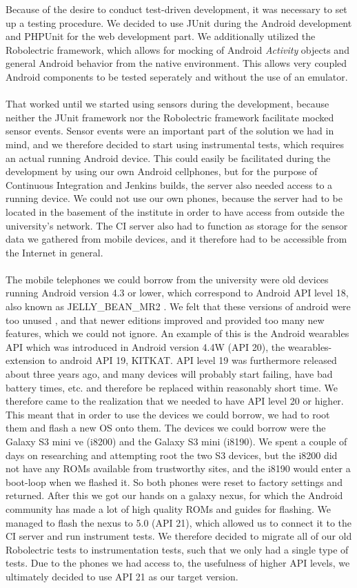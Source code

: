 Because of the desire to conduct test-driven development, it was necessary to set up a testing procedure. We decided to use JUnit during the Android development and PHPUnit for the web development part. We additionally utilized the Robolectric framework, which allows for mocking of Android \emph{Activity} objects and general Android behavior from the native environment. This allows very coupled Android components to be tested seperately and without the use of an emulator. 
\\\\
That worked until we started using sensors during the development, because neither the JUnit framework nor the Robolectric framework facilitate mocked sensor events. Sensor events were an important part of the solution we had in mind, and we therefore decided to start using instrumental tests, which requires an actual running Android device. This could easily be facilitated during the development by using our own Android cellphones, but for the purpose of Continuous Integration and Jenkins builds, the server also needed access to a running device. We could not use our own phones, because the server had to be located in the basement of the institute in order to have access from outside the university's network. The CI server also had to function as storage for the sensor data we gathered from mobile devices, and it therefore had to be accessible from the Internet in general.
\\\\
The mobile telephones we could borrow from the university were old devices running Android version 4.3 or lower, which correspond to Android API level 18, also known as JELLY\_BEAN\_MR2 \parencite{uses_sdk}. We felt that these versions of android were too unused \parencite{android_dashboard}, and that newer editions improved and provided too many new features, which we could not ignore. An example of this is the Android wearables API which was introduced in Android version 4.4W (API 20), the wearables-extension to android API 19, KITKAT. API level 19 was furthermore released about three years ago, and many devices will probably start failing, have bad battery times, etc. and therefore be replaced within reasonably short time. We therefore came to the realization that we needed to have API level 20 or higher. This meant that in order to use the devices we could borrow, we had to root them and flash a new OS onto them. The devices we could borrow were the Galaxy S3 mini ve (i8200) and the Galaxy S3 mini (i8190). We spent a couple of days on researching and attempting root the two S3 devices, but the i8200 did not have any ROMs available from trustworthy sites, and the i8190 would enter a boot-loop when we flashed it. So both phones were reset to factory settings and returned. After this we got our hands on a galaxy nexus, for which the Android community has made a lot of high quality ROMs and guides for flashing. We managed to flash the nexus to 5.0 (API 21), which allowed us to connect it to the CI server and run instrument tests. We therefore decided to migrate all of our old Robolectric tests to instrumentation tests, such that we only had a single type of tests. Due to the phones we had access to, the usefulness of higher API levels, we ultimately decided to use API 21 as our target version. 
